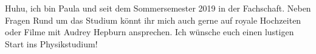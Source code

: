 \begin{multicols}{2}
{
Huhu, ich bin Paula und seit dem Sommersemester 2019 in der Fachschaft. Neben Fragen Rund um das Studium könnt ihr mich auch gerne auf royale Hochzeiten oder Filme mit Audrey Hepburn ansprechen. 
Ich wünsche euch einen lustigen Start ins Physikstudium!
}


\end{multicols}
